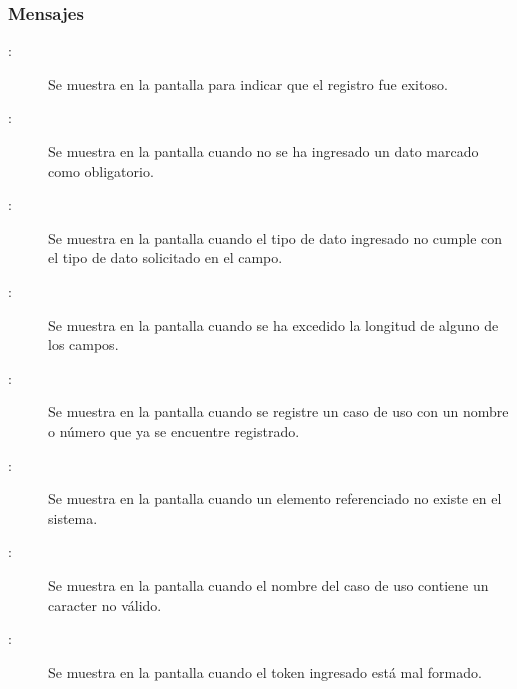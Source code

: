 \subsubsection{Mensajes}

	
\begin{description}
			\item[:] Se muestra en la pantalla  para indicar que el registro fue exitoso.
	
			\item[:] Se muestra en la pantalla  cuando no se ha ingresado un dato marcado como obligatorio.
			\item[:] Se muestra en la pantalla  cuando el tipo de dato ingresado no cumple con el tipo de dato solicitado en el campo.
			\item[:] Se muestra en la pantalla  cuando se ha excedido la longitud de alguno de los campos.
			\item[:] Se muestra en la pantalla  cuando se registre un caso de uso con un nombre o número que ya se encuentre registrado.
			\item[:] Se muestra en la pantalla  cuando un elemento referenciado no existe en el sistema.
			\item[:] Se muestra en la pantalla  cuando el nombre del caso de uso contiene un caracter no válido.
			\item[:] Se muestra en la pantalla  cuando el token ingresado está mal formado.
\end{description}
